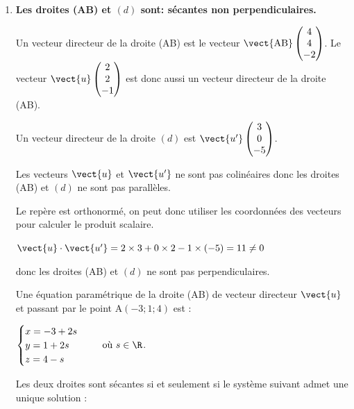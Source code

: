 \medskip

\begin{enumerate}
\item \textbf{Les droites (AB) et $(d)$ sont: sécantes non perpendiculaires.}

\medskip 

Un vecteur directeur de la droite (AB) est  le vecteur $\vect{\mathrm{AB}} \begin{pmatrix}  4\\4\\-2
\end{pmatrix}$.  Le vecteur $\vect{u} \begin{pmatrix}  2\\2\\-1
\end{pmatrix}$  est donc aussi un vecteur directeur de la droite (AB).

Un vecteur directeur de la droite $(d)$ est $\vect{u'} \begin{pmatrix}
3\\0\\- 5
\end{pmatrix}$.

Les vecteurs $\vect{u}$ et $\vect{u'}$ ne sont pas colinéaires donc les droites (AB) et $(d)$ ne sont pas parallèles.

Le repère est orthonormé, on peut donc utiliser les coordonnées des vecteurs pour calculer le produit scalaire.

 $\vect{u} \cdot \vect{u'} =2 \times 3 + 0 \times 2 - 1 \times (-5) = 11 \neq 0$

donc  les droites (AB) et $(d)$ ne sont pas perpendiculaires.

Une équation paramétrique de la droite (AB) de vecteur directeur $\vect{u}$ et passant par le point A$(-3;1;4)$ est :

$\begin{cases}x=-3+2 s\\ y=1 +2s \\ z=4-s\end{cases} \quad \text{ où } s \in \R$.

Les deux droites sont sécantes si et seulement si le système suivant admet une unique solution :


\end{enumerate}

